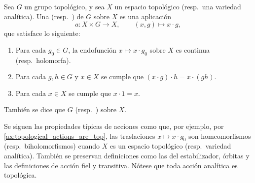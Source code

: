 \documentclass[teoria-numeros.tex]{subfiles}
\begin{document}
\begin{mydef}
	Sea $G$ un grupo topológico, y sea $X$ un espacio topológico (resp.\ una variedad analítica).
	Una  (resp.\ ) de $G$ sobre $X$
	es una aplicación
	\[
		a \colon X \times G \longrightarrow X, \qquad (x, g) \longmapsto x\cdot g,
	\]
	que satisface lo siguiente:
	\begin{enumerate}[{AT}1., leftmargin=*, ref=AT\arabic*]
		\item\label{ax:topological_actions_are_top}
			Para cada $g_0 \in G$, la endofunción $x \mapsto x\cdot g_0$ sobre $X$ es continua (resp.\ holomorfa).
		\item Para cada $g, h \in G$ y $x \in X$ se cumple que $(x\cdot g)\cdot h = x\cdot(gh)$.
		\item Para cada $x \in X$ se cumple que $x\cdot 1 = x$.
	\end{enumerate}
	También se dice que $G$  (resp.\ ) sobre $X$.
\end{mydef}
Se siguen las propiedades típicas de acciones como que, por ejemplo, por \ref{ax:topological_actions_are_top}, las traslaciones $x \mapsto x\cdot g_0$
son homeomorfismos (resp.\ biholomorfismos) cuando $X$ es un espacio topológico (resp.\ variedad analítica).
También se preservan definiciones como las del estabilizador, órbitas y las definiciones de acción fiel y transitiva.
Nótese que toda acción analítica es topológica.
\end{document}

